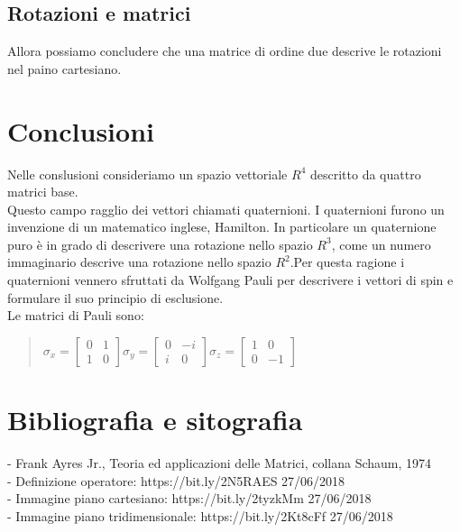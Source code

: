 \documentclass[a4paper]{article}
\begin{document}
\subsection{Rotazioni e matrici}
Allora possiamo concludere che una matrice di ordine due descrive le rotazioni nel paino cartesiano.
\section{Conclusioni}
Nelle conslusioni consideriamo un spazio vettoriale $R^4$ descritto da quattro matrici base.
\\Questo campo ragglio dei vettori chiamati quaternioni. I quaternioni furono un invenzione di un matematico inglese, Hamilton. In particolare un quaternione puro è in grado di descrivere una rotazione nello spazio $R^3$, come un numero immaginario descrive una rotazione nello spazio $R^2$.Per questa ragione i quaternioni vennero sfruttati da Wolfgang Pauli per descrivere i vettori di spin e formulare il suo principio di esclusione.
\\
Le matrici di Pauli sono:
\begin{quote} \centering$\sigma_{x}=\left[\begin{matrix}0&1\\ 1&0 \end{matrix}\right] \sigma_{y}=\left[\begin{matrix}0&-\textit{i}\\ \textit{i}&0 \end{matrix}\right] \sigma_{z}=\left[\begin{matrix}1&0\\ 0&-1 \end{matrix}\right]
$\end{quote}

\section{Bibliografia e sitografia}
- Frank Ayres Jr., Teoria ed applicazioni delle Matrici, collana Schaum, 1974\\
- Definizione operatore: https://bit.ly/2N5RAES 27/06/2018\\
- Immagine piano cartesiano: https://bit.ly/2tyzkMm 27/06/2018\\
- Immagine piano tridimensionale: https://bit.ly/2Kt8cFf 27/06/2018
\end{document}
